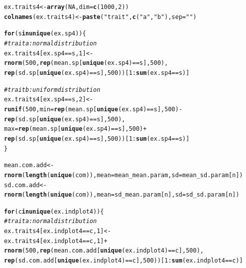 \documentclass[12pt]{article}\usepackage[]{graphicx}\usepackage[]{color}
\makeatletter
\newcommand{\hlnum}[1]{\textcolor[rgb]{0.686,0.059,0.569}{#1}}%
\newcommand{\hlstr}[1]{\textcolor[rgb]{0.192,0.494,0.8}{#1}}%
\newcommand{\hlcom}[1]{\textcolor[rgb]{0.678,0.584,0.686}{\textit{#1}}}%
\newcommand{\hlopt}[1]{\textcolor[rgb]{0,0,0}{#1}}%
\newcommand{\hlstd}[1]{\textcolor[rgb]{0.345,0.345,0.345}{#1}}%
\newcommand{\hlkwa}[1]{\textcolor[rgb]{0.161,0.373,0.58}{\textbf{#1}}}%
\newcommand{\hlkwb}[1]{\textcolor[rgb]{0.69,0.353,0.396}{#1}}%
\newcommand{\hlkwc}[1]{\textcolor[rgb]{0.333,0.667,0.333}{#1}}%
\newcommand{\hlkwd}[1]{\textcolor[rgb]{0.737,0.353,0.396}{\textbf{#1}}}%
\newenvironment{kframe}{%
 \def\at@end@of@kframe{}%
 \ifinner\ifhmode%
  \def\at@end@of@kframe{\end{minipage}}%
  \begin{minipage}{\columnwidth}%
 \fi\fi%
 \def\FrameCommand##1{\hskip\@totalleftmargin \hskip-\fboxsep
 \colorbox{shadecolor}{##1}\hskip-\fboxsep
     \hskip-\linewidth \hskip-\@totalleftmargin \hskip\columnwidth}%
 \MakeFramed {\advance\hsize-\width
   \@totalleftmargin\z@ \linewidth\hsize
   \@setminipage}}%
 {\par\unskip\endMakeFramed%
 \at@end@of@kframe}
\newenvironment{knitrout}{}{} %
\makeatother
\begin{document}
\begin{knitrout}
\begin{kframe}
\begin{alltt}
\hlstd{ex.traits4} \hlkwb{<-} \hlkwd{array}\hlstd{(}\hlnum{NA}\hlstd{,} \hlkwc{dim} \hlstd{=} \hlkwd{c}\hlstd{(}\hlnum{1000}\hlstd{,} \hlnum{2}\hlstd{))}
\hlkwd{colnames}\hlstd{(ex.traits4)} \hlkwb{<-} \hlkwd{paste}\hlstd{(}\hlstr{"trait"}\hlstd{,} \hlkwd{c}\hlstd{(}\hlstr{"a"}\hlstd{,} \hlstr{"b"}\hlstd{),} \hlkwc{sep} \hlstd{=} \hlstr{" "}\hlstd{)}

\hlkwa{for}\hlstd{(s} \hlkwa{in} \hlkwd{unique}\hlstd{(ex.sp4))\{}
 \hlcom{#trait a : normal distribution}
 \hlstd{ex.traits4[ex.sp4} \hlopt{==} \hlstd{s,} \hlnum{1}\hlstd{]} \hlkwb{<-} \hlkwd{rnorm}\hlstd{(}\hlnum{500}\hlstd{,} \hlkwd{rep}\hlstd{(mean.sp[}\hlkwd{unique}\hlstd{(ex.sp4)} \hlopt{==} \hlstd{s],} \hlnum{500}\hlstd{),}
         \hlkwd{rep}\hlstd{(sd.sp[}\hlkwd{unique}\hlstd{(ex.sp4)} \hlopt{==} \hlstd{s],} \hlnum{500}\hlstd{))[}\hlnum{1}\hlopt{:}\hlkwd{sum}\hlstd{(ex.sp4} \hlopt{==} \hlstd{s)]}

 \hlcom{#trait b : uniform distribution}
 \hlstd{ex.traits4[ex.sp4} \hlopt{==} \hlstd{s,} \hlnum{2}\hlstd{]} \hlkwb{<-} \hlkwd{runif}\hlstd{(}\hlnum{500}\hlstd{,} \hlkwc{min} \hlstd{=} \hlkwd{rep}\hlstd{(mean.sp[}\hlkwd{unique}\hlstd{(ex.sp4)} \hlopt{==} \hlstd{s],} \hlnum{500}\hlstd{)} \hlopt{-}
         \hlkwd{rep}\hlstd{(sd.sp[}\hlkwd{unique}\hlstd{(ex.sp4)} \hlopt{==} \hlstd{s],} \hlnum{500}\hlstd{),}
         \hlkwc{max} \hlstd{=} \hlkwd{rep}\hlstd{(mean.sp[}\hlkwd{unique}\hlstd{(ex.sp4)} \hlopt{==} \hlstd{s],} \hlnum{500}\hlstd{)} \hlopt{+}
         \hlkwd{rep}\hlstd{(sd.sp[}\hlkwd{unique}\hlstd{(ex.sp4)} \hlopt{==} \hlstd{s],} \hlnum{500}\hlstd{))[}\hlnum{1}\hlopt{:}\hlkwd{sum}\hlstd{(ex.sp4} \hlopt{==} \hlstd{s)]}
\hlstd{\}}

\hlstd{mean.com.add} \hlkwb{<-} \hlkwd{rnorm}\hlstd{(}\hlkwd{length}\hlstd{(}\hlkwd{unique}\hlstd{(com)),} \hlkwc{mean} \hlstd{= mean_mean.param,} \hlkwc{sd} \hlstd{= mean_sd.param[n])}
\hlstd{sd.com.add} \hlkwb{<-} \hlkwd{rnorm}\hlstd{(}\hlkwd{length}\hlstd{(}\hlkwd{unique}\hlstd{(com)),} \hlkwc{mean} \hlstd{= sd_mean.param[n],} \hlkwc{sd} \hlstd{= sd_sd.param[n])}

\hlkwa{for}\hlstd{(c} \hlkwa{in} \hlkwd{unique}\hlstd{(ex.indplot4))\{}
 \hlcom{#trait a : normal distribution}
 \hlstd{ex.traits4[ex.indplot4} \hlopt{==} \hlstd{c,} \hlnum{1}\hlstd{]} \hlkwb{<-}
 \hlstd{ex.traits4[ex.indplot4} \hlopt{==} \hlstd{c,} \hlnum{1}\hlstd{]} \hlopt{+}
 \hlkwd{rnorm}\hlstd{(}\hlnum{500}\hlstd{,} \hlkwd{rep}\hlstd{(mean.com.add[}\hlkwd{unique}\hlstd{(ex.indplot4)} \hlopt{==} \hlstd{c],} \hlnum{500}\hlstd{),}
 \hlkwd{rep}\hlstd{(sd.com.add [}\hlkwd{unique}\hlstd{(ex.indplot4)} \hlopt{==} \hlstd{c],} \hlnum{500}\hlstd{))[}\hlnum{1}\hlopt{:}\hlkwd{sum}\hlstd{(ex.indplot4} \hlopt{==} \hlstd{c)]}


\end{alltt}
\end{kframe}
\end{knitrout}
\end{document}
